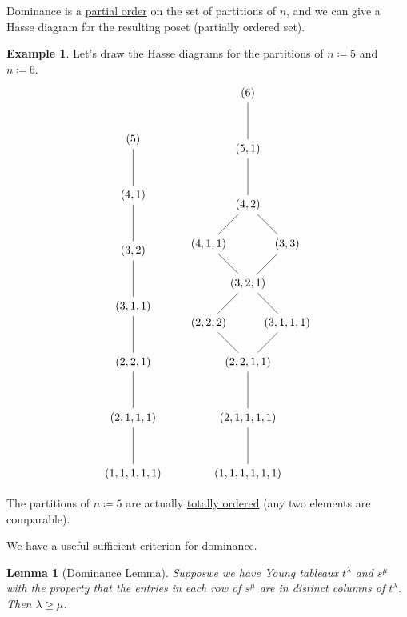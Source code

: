 \documentclass[12pt]{article}
\newtheorem{lemma}[theorem]{Lemma}
\theoremstyle{definition}
\newtheorem{example}{Example}[section]
\begin{document}
Dominance is a \underline{partial order} on the set of partitions of $n$, and we can give a Hasse diagram for the resulting poset (partially ordered set).
\begin{example}
    Let's draw the Hasse diagrams for the partitions of $n \coloneqq  5$ and $n \coloneqq  6$.
    \begin{equation}
        \begin{tikzpicture}[node distance=1.75cm]
            \node (5) {$(5)$};
            \node (41) [below of = 5] {$(4,1)$};
            \node (32) [below of = 41] {$(3,2)$};
            \node (311) [below of = 32] {$(3,1,1)$};
            \node (221) [below of = 311] {$(2,2,1)$};
            \node (2111) [below of = 221] {$(2,1,1,1)$};
            \node (11111) [below of = 2111] {$(1,1,1,1,1)$};
            
            \draw (5) -- (41) -- (32) -- (311) -- (221) -- (2111) -- (11111);
        \end{tikzpicture}
        \qquad 
        \begin{tikzpicture}[node distance=1.75cm]
            \node (6) {$(6)$};
            \node (51) [below of = 6] {$(5,1)$};
            \node (42) [below of = 51] {$(4,2)$};
            \node (411) [below left of = 42] {$(4,1,1)$};
            \node (33) [below right of = 42] {$(3,3)$};
            \node (321) [below left of = 33] {$(3,2,1)$};
            \node (222) [below left of = 321] {$(2,2,2)$};
            \node (3111) [below right of = 321] {$(3,1,1,1)$};
            \node (2211) [below left of = 3111] {$(2,2,1,1)$};
            \node (21111) [below of = 2211] {$(2,1,1,1,1)$};
            \node (111111) [below of = 21111] {$(1,1,1,1,1,1)$};
            
            \draw (6) -- (51) -- (42) -- (33) -- (321) -- (3111) -- (2211) -- (21111) -- (111111);
            \draw (42) -- (411) -- (321) -- (222) -- (2211);
        \end{tikzpicture}
    \end{equation}
    The partitions of $n \coloneqq  5$ are actually \underline{totally ordered} (any two elements are comparable). 
\end{example}
We have a useful sufficient criterion for dominance.
\begin{lemma}[Dominance Lemma]
    Supposwe we have Young tableaux $t^{\lambda}$ and $s^{\mu}$ with the property that the entries in each row of $s^{\mu}$ are in distinct columns of $t^{\lambda}$. Then $\lambda \trianglerighteq \mu$.
\end{lemma}
\end{document}
